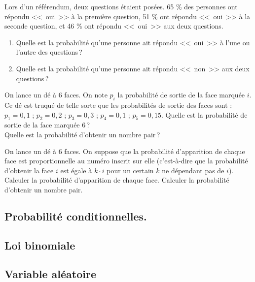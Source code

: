 %
\begin{exo}
Lors d’un référendum, deux questions étaient posées.
65 \% des personnes ont répondu <<~oui~>> à la première question, 51 \% ont répondu <<~oui~>> à la seconde question, et 46 \%
ont répondu <<~oui~>> aux deux questions.
\begin{enumerate}
\item Quelle est la probabilité qu’une personne ait répondu <<~oui~>> à l’une ou l’autre des questions\,?
\item Quelle est la probabilité qu’une personne ait répondu <<~non~>> aux deux questions\,?
\end{enumerate}
\end{exo}
%
\begin{exo}
On lance un dé à 6 faces. On note $p_i$ la probabilité de sortie de la face marquée $i$. 
Ce dé est truqué de telle sorte que les probabilités de sortie des faces sont :
       $p_1 = 0,1$ ; $p_2 = 0, 2$ ; $p_3 = 0,3$ ; $p_4 = 0,1$ ; $p_5 = 0,15$. \newline
Quelle est la probabilité de sortie de la face marquée 6\,? \\
Quelle est la probabilité d’obtenir un nombre pair\,?
\end{exo}
%
\begin{exo}
On lance un dé à 6 faces. 
On suppose que la probabilité d’apparition de chaque face est proportionnelle au numéro inscrit sur elle 
(c'est-\`a-dire que la probabilit\'e d'obtenir la face $i$ est \'egale \`a $k \cdot i$ pour un certain $k$ ne d\'ependant pas de $i$).
Calculer la probabilité d’apparition de chaque face.
Calculer la probabilité d’obtenir un nombre pair.
\end{exo}
%
\subsection*{Probabilité conditionnelles.}
%
\subsection*{Loi binomiale}
%
\subsection*{Variable al\'eatoire}

